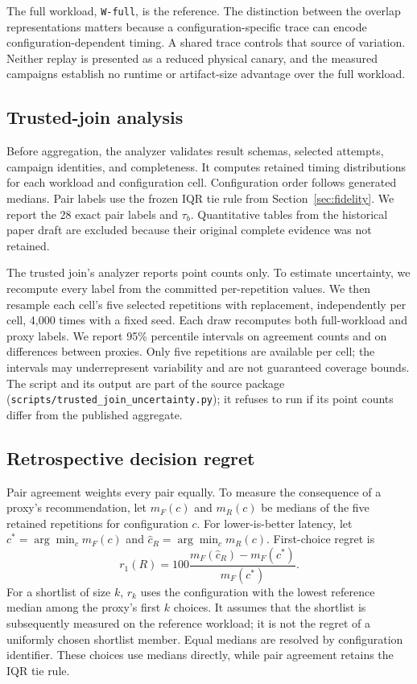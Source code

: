 \documentclass[10pt,twocolumn]{article}
\newcommand{\wname}[1]{\texttt{W-#1}}
\begin{document}
The full workload, \wname{full}, is the reference. The distinction between the
overlap representations matters because a configuration-specific trace can
encode configuration-dependent timing. A shared trace controls that source of
variation. Neither replay is presented as a reduced physical canary, and the
measured campaigns establish no runtime or artifact-size advantage over the
full workload.

\subsection{Trusted-join analysis}

Before aggregation, the analyzer validates result schemas, selected attempts,
campaign identities, and completeness. It computes retained timing
distributions for each workload and configuration cell. Configuration order
follows generated medians. Pair labels use the frozen IQR tie rule from
Section~\ref{sec:fidelity}. We report the 28 exact pair labels and $\tau_b$. Quantitative
tables from the historical paper draft are excluded because their original
complete evidence was not retained.

The trusted join's analyzer reports point counts only. To estimate uncertainty,
we recompute every label from the committed per-repetition values. We then
resample each cell's five selected repetitions with replacement, independently
per cell, 4,000 times with a fixed seed. Each draw recomputes both full-workload
and proxy labels. We report 95\% percentile intervals on agreement counts
and on differences between proxies. Only five repetitions are available per
cell; the intervals may underrepresent variability and are not guaranteed
coverage bounds. The script
and its output are part of the source package
(\texttt{scripts/trusted\_join\_uncertainty.py}); it refuses to run if its point
counts differ from the published aggregate.

\subsection{Retrospective decision regret}
\label{sec:regret-method}

Pair agreement weights every pair equally. To measure the consequence of a
proxy's recommendation, let $m_F(c)$ and $m_R(c)$ be medians of the five retained
repetitions for configuration $c$. For lower-is-better latency, let
$c^*=\arg\min_c m_F(c)$ and $\hat c_R=\arg\min_c m_R(c)$. First-choice regret is
\begin{equation}
  r_1(R)=100\frac{m_F(\hat c_R)-m_F(c^*)}{m_F(c^*)}.
\end{equation}
For a shortlist of size $k$, $r_k$ uses the configuration with the lowest
reference median among the proxy's first $k$ choices. It assumes that the
shortlist is subsequently measured on the reference workload; it is not the
regret of a uniformly chosen shortlist member. Equal medians are resolved by
configuration identifier. These choices use medians directly, while pair
agreement retains the IQR tie rule.
\end{document}
